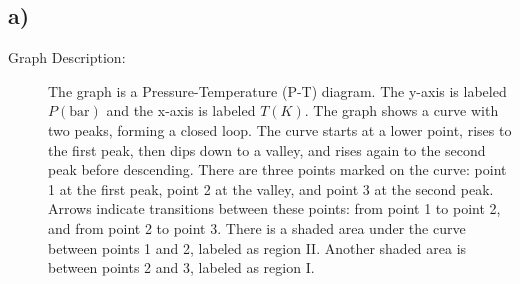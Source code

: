 

\subsection*{a)}

\begin{description}
    \item[Graph Description:] The graph is a Pressure-Temperature (P-T) diagram. The y-axis is labeled \(P (\text{bar})\) and the x-axis is labeled \(T (K)\). The graph shows a curve with two peaks, forming a closed loop. The curve starts at a lower point, rises to the first peak, then dips down to a valley, and rises again to the second peak before descending. There are three points marked on the curve: point 1 at the first peak, point 2 at the valley, and point 3 at the second peak. Arrows indicate transitions between these points: from point 1 to point 2, and from point 2 to point 3. There is a shaded area under the curve between points 1 and 2, labeled as region II. Another shaded area is between points 2 and 3, labeled as region I.
\end{description}